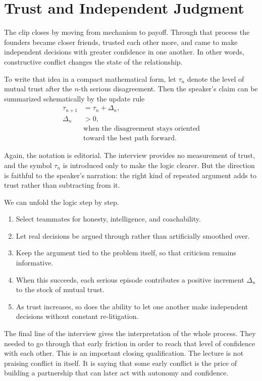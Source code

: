 \section{Trust and Independent Judgment}

The clip closes by moving from mechanism to payoff. Through that process the founders became closer friends, trusted each other more, and came to make independent decisions with greater confidence in one another. In other words, constructive conflict changes the state of the relationship.

To write that idea in a compact mathematical form, let \(\tau_n\) denote the level of mutual trust after the \(n\)-th serious disagreement. Then the speaker's claim can be summarized schematically by the update rule
\begin{align}
\tau_{n+1} &= \tau_n + \Delta_n,\\
\Delta_n &> 0,\\
&\text{when the disagreement stays oriented}\\
&\text{toward the best path forward.}
\end{align}

Again, the notation is editorial. The interview provides no measurement of trust, and the symbol \(\tau_n\) is introduced only to make the logic clearer. But the direction is faithful to the speaker's narration: the right kind of repeated argument adds to trust rather than subtracting from it.

We can unfold the logic step by step.
\begin{enumerate}
\item Select teammates for honesty, intelligence, and coachability.
\item Let real decisions be argued through rather than artificially smoothed over.
\item Keep the argument tied to the problem itself, so that criticism remains informative.
\item When this succeeds, each serious episode contributes a positive increment \(\Delta_n\) to the stock of mutual trust.
\item As trust increases, so does the ability to let one another make independent decisions without constant re-litigation.
\end{enumerate}

The final line of the interview gives the interpretation of the whole process. They needed to go through that early friction in order to reach that level of confidence with each other. This is an important closing qualification. The lecture is not praising conflict in itself. It is saying that some early conflict is the price of building a partnership that can later act with autonomy and confidence.

